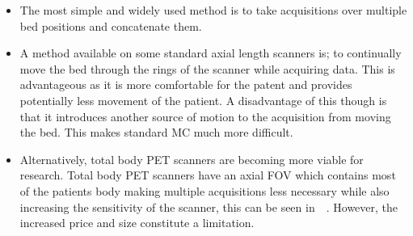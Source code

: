                 \begin{itemize}
                    \item The most simple and widely used method is to take acquisitions over multiple bed positions and concatenate them.
                    
                    \item A method available on some  standard axial length scanners is; to continually move the bed through the rings of the scanner while acquiring data. This is advantageous as it is more comfortable for the patent and provides potentially less movement of the patient. %
                    A disadvantage of this though is that it introduces another source of motion to the acquisition from moving the bed. This makes standard \gls{MC} much more difficult.
                    
                    \item Alternatively, total body \gls{PET} scanners are becoming more viable for research. %
                    Total body \gls{PET} scanners have an axial \gls{FOV} which contains most of the patients body making multiple acquisitions less necessary while also increasing the sensitivity of the scanner, this can be seen in~~\parencite{Cherry2018}. However, the increased price and size constitute a limitation.
                \end{itemize}
            
